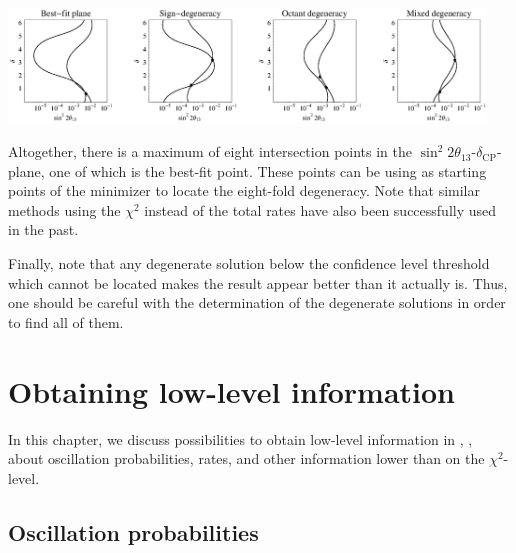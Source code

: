 \begin{description}
\begin{center}
\includegraphics[width=0.95\textwidth]{ircurves}
\end{center}
 Altogether, there is a maximum of eight intersection points in the $\sin^2 2 \theta_{13}$-$\delta_{\mathrm{CP}}$-plane, one of which is the best-fit point. These points can be using as starting points of the minimizer to locate the eight-fold degeneracy. Note that similar methods using the $\chi^2$ instead of the total rates have also been successfully used in the past. 
\end{description}
Finally, note that any degenerate solution below the confidence level threshold which cannot be located makes the result appear better than it actually is. Thus, one should be careful with the determination of the degenerate solutions in order to find all of them.


\chapter{Obtaining low-level information}

In this chapter, we discuss possibilities to obtain low-level information
in \GLOBES , \ie, about oscillation probabilities, rates, and other
information lower than on the $\chi^2$-level.

\section{Oscillation probabilities}

